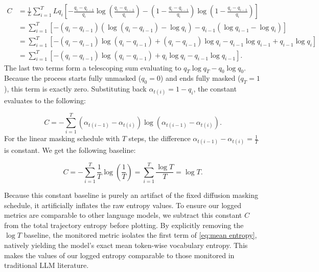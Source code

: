 {\allowdisplaybreaks
    \begin{align*}
        C & = \frac{1}{L} \sum_{i=1}^{T} L q_i \left[ -\frac{q_i - q_{i-1}}{q_i}\log\left(\frac{q_i - q_{i-1}}{q_i}\right) - \left(1 - \frac{q_i - q_{i-1}}{q_i}\right)\log\left(1 - \frac{q_i - q_{i-1}}{q_i}\right) \right] \\
          & = \sum_{i=1}^{T} \left[ -(q_i - q_{i-1})\left(\log(q_i - q_{i-1}) - \log q_i\right) - q_{i-1}\left(\log q_{i-1} - \log q_i\right) \right]                                                                         \\
          & = \sum_{i=1}^{T} \left[ -(q_i - q_{i-1})\log(q_i - q_{i-1}) + (q_i - q_{i-1})\log q_i - q_{i-1}\log q_{i-1} + q_{i-1}\log q_i \right]                                                                             \\
          & = \sum_{i=1}^{T} \left[ -(q_i - q_{i-1})\log(q_i - q_{i-1}) + q_i\log q_i - q_{i-1}\log q_{i-1} \right].
    \end{align*}
}The last two terms form a telescoping sum evaluating to $q_T \log q_T - q_0 \log q_0$. Because the process starts fully unmasked ($q_0 = 0$) and ends fully masked ($q_T = 1$), this term is exactly zero. Substituting back $\alpha_{t(i)} = 1 - q_i$, the constant evaluates to the following:

\begin{equation*}
    C = -\sum_{i=1}^{T} (\alpha_{t(i-1)} - \alpha_{t(i)}) \log(\alpha_{t(i-1)} - \alpha_{t(i)}).
\end{equation*}
For the linear masking schedule with $T$ steps, the difference $\alpha_{t(i-1)} - \alpha_{t(i)} = \frac{1}{T}$ is constant. We get the following baseline:

\begin{equation*}
    C = -\sum_{i=1}^{T} \frac{1}{T} \log\left(\frac{1}{T}\right) = \sum_{i=1}^{T} \frac{\log T}{T} = \log T.
\end{equation*}

Because this constant baseline is purely an artifact of the fixed diffusion masking schedule, it artificially inflates the raw entropy values. To ensure our logged metrics are comparable to other language models, we subtract this constant $C$ from the total trajectory entropy before plotting. By explicitly removing the $\log T$ baseline, the monitored metric isolates the first term of \eqref{eq:mean entropy}, natively yielding the model's exact mean token-wise vocabulary entropy. This makes the values of our logged entropy comparable to those monitored in traditional LLM literature.

